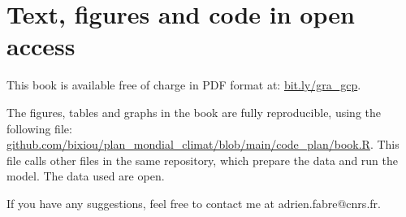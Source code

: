 \documentclass[a5paper,english,openany]{memoir}
\begin{document}
\section*{Text, figures and code in open access}

This book is available free of charge in PDF format at: \href{https://global-redistribution-advocates.org/the-global-climate-plan/}{bit.ly/gra\_gcp}. 

The figures, tables and graphs in the book are fully reproducible, using the following file:\\ \href{https://github.com/bixiou/plan_mondial_climat/blob/main/code_plan/book.R}{github.com/bixiou/plan\_mondial\_climat/blob/main/code\_plan/book.R}. This file calls other files in the same repository, which prepare the data and run the model. The data used are open.

If you have any suggestions, feel free to contact me at adrien.fabre@cnrs.fr.

\renewcommand{\url}[1]{\href{#1}{Link}} %
{\small 

}

\clearpage
\end{document}
